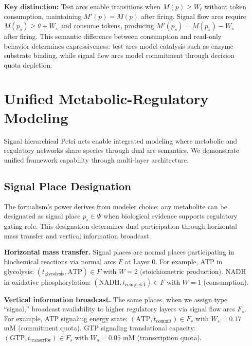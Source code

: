 \documentclass[10pt,letterpaper]{article}
\begin{document}
\textbf{Key distinction:} Test arcs enable transitions when $M(p) \geq W_t$ without token consumption, maintaining $M'(p) = M(p)$ after firing. Signal flow arcs require $M(p_s) \geq \theta + W_s$ and consume tokens, producing $M'(p_s) = M(p_s) - W_s$ after firing. This semantic difference between consumption and read-only behavior determines expressiveness: test arcs model catalysis such as enzyme-substrate binding, while signal flow arcs model commitment through decision quota depletion.

\section{Unified Metabolic-Regulatory Modeling}

Signal hierarchical Petri nets enable integrated modeling where metabolic and regulatory networks share species through dual arc semantics. We demonstrate unified framework capability through multi-layer architecture.

\subsection{Signal Place Designation}

The formalism's power derives from modeler choice: any metabolite can be designated as signal place $p_s \in \Psi$ when biological evidence supports regulatory gating role. This designation determines dual participation through horizontal mass transfer and vertical information broadcast.

\vspace{3pt}
\noindent\textbf{Horizontal mass transfer.} Signal places are normal places participating in biochemical reactions via normal arcs $F$ at Layer 0. For example, ATP in glycolysis: $(t_{\text{glycolysis}}, \text{ATP}) \in F$ with $W = 2$ (stoichiometric production). NADH in oxidative phosphorylation: $(\text{NADH}, t_{\text{complex-I}}) \in F$ with $W = 1$ (consumption).

\vspace{3pt}
\noindent\textbf{Vertical information broadcast.} The same places, when we assign type ``signal,'' broadcast availability to higher regulatory layers via signal flow arcs $F_s$. For example, ATP signaling energy state: $(\text{ATP}, t_{\text{commit}}) \in F_s$ with $W_s = 0.17$ mM (commitment quota). GTP signaling translational capacity: $(\text{GTP}, t_{\text{transcribe}}) \in F_s$ with $W_s = 0.05$ mM (transcription quota).
\end{document}
